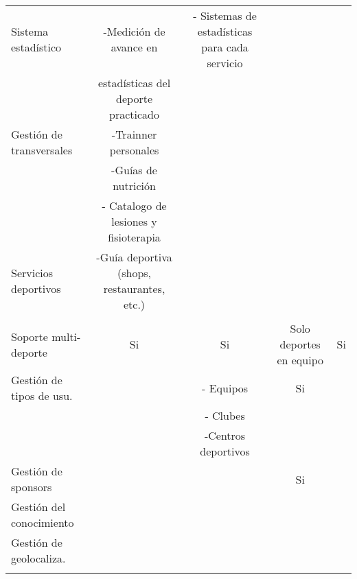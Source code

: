 \begin{landscape}
\begin{table}
\begin{center}
{\begin{tabular}{|p{5cm}|llll|}
    \hline
    Sistema estadístico & \multicolumn{1}{c}{-Medición de avance en} & \multicolumn{1}{c}{- Sistemas de estadísticas para cada servicio} & \multicolumn{1}{c}{} & \multicolumn{1}{c|}{} \\ 
     & \multicolumn{1}{c}{ estadísticas del deporte practicado} & \multicolumn{1}{c}{} & \multicolumn{1}{c}{} & \multicolumn{1}{c|}{} \\ 
    \hline
    Gestión de transversales & \multicolumn{1}{c}{-Trainner personales} & \multicolumn{1}{c}{} & \multicolumn{1}{c}{} & \multicolumn{1}{c|}{} \\ 
     & \multicolumn{1}{c}{-Guías de nutrición} & \multicolumn{1}{c}{} & \multicolumn{1}{c}{} & \multicolumn{1}{c|}{} \\ 
     & \multicolumn{1}{c}{- Catalogo de lesiones y fisioterapia} & \multicolumn{1}{c}{} & \multicolumn{1}{c}{} & \multicolumn{1}{c|}{} \\ 
    \hline
    Servicios deportivos & \multicolumn{1}{c}{-Guía deportiva (shops, restaurantes, etc.)} & \multicolumn{1}{c}{} & \multicolumn{1}{c}{} & \multicolumn{1}{c|}{} \\ 
     & \multicolumn{1}{c}{} & \multicolumn{1}{c}{} & \multicolumn{1}{c}{} & \multicolumn{1}{c|}{} \\ 
    \hline
    Soporte multi-deporte & \multicolumn{1}{c}{Si} & \multicolumn{1}{c}{Si} & \multicolumn{1}{c}{Solo deportes en equipo} & \multicolumn{1}{c|}{Si} \\ 
    \hline
    Gestión de tipos de usu. & \multicolumn{1}{c}{} & \multicolumn{1}{c}{- Equipos } & \multicolumn{1}{c}{Si} & \multicolumn{1}{c|}{} \\ 
     & \multicolumn{1}{c}{} & \multicolumn{1}{c}{- Clubes} & \multicolumn{1}{c}{} & \multicolumn{1}{c|}{} \\ 
     & \multicolumn{1}{c}{} & \multicolumn{1}{c}{-Centros deportivos} & \multicolumn{1}{c}{} & \multicolumn{1}{c|}{} \\ 
    \hline
    Gestión de sponsors & \multicolumn{1}{c}{} & \multicolumn{1}{c}{} & \multicolumn{1}{c}{Si} & \multicolumn{1}{c|}{} \\ 
    \hline
    Gestión del conocimiento & \multicolumn{1}{c}{} & \multicolumn{1}{c}{} & \multicolumn{1}{c}{} & \multicolumn{1}{c|}{} \\ 
    \hline
    Gestión de geolocaliza. & \multicolumn{1}{c}{} & \multicolumn{1}{c}{} & \multicolumn{1}{c}{} & \multicolumn{1}{c|}{} \\ 
     & \multicolumn{1}{c}{} & \multicolumn{1}{c}{} & \multicolumn{1}{c}{} & \multicolumn{1}{c|}{} \\ 

\end{tabular}}
\end{center}
\end{table}
\end{landscape}
